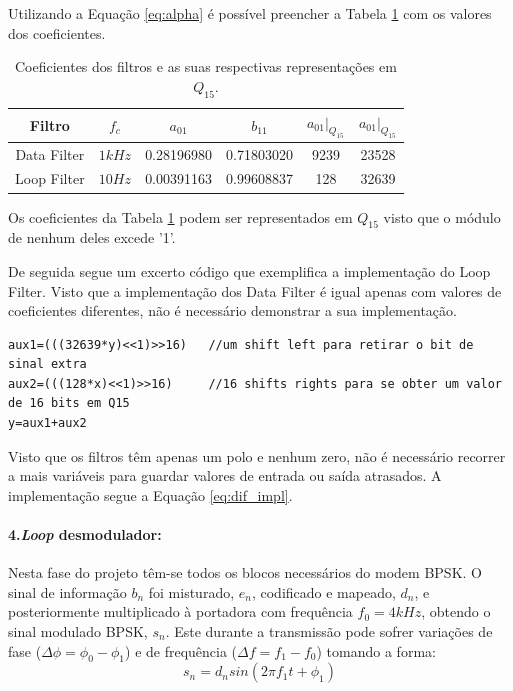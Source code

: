 \documentclass[11pt]{article}
\numberwithin{equation}{section}
\begin{document}
Utilizando a Equação \ref{eq:alpha} é possível preencher a Tabela \ref{tab:filter_coef} com os valores dos coeficientes.

	\begin{table}[H]
		\centering
		\begin{tabular}{|c|c|c|c|c|c|}
			\hline Filtro & $ f_{c} $ & $ a_{01} $ &  $ b_{11} $ & $ a_{01}|_{Q_{15}} $& $ a_{01}|_{Q_{15}} $ \\ 
			\hline
			\hline Data Filter & $ 1kHz $ & 0.28196980 & 0.71803020 & 9239 & 23528 \\ 
			\hline Loop Filter & $ 10Hz $ & 0.00391163 & 0.99608837 & 128 & 32639 \\ 
			\hline
		\end{tabular}
		\caption{Coeficientes dos filtros e as suas respectivas representações em $ Q_{15} $.}
		\label{tab:filter_coef} 
	\end{table}
	
Os coeficientes da Tabela \ref{tab:filter_coef} podem ser representados em $ Q_{15} $ visto que o módulo de nenhum deles excede '1'.

De seguida segue um excerto código que exemplifica a implementação do Loop Filter. Visto que a implementação dos Data Filter é igual apenas com valores de coeficientes diferentes, não é necessário demonstrar a sua implementação.

\begin{lstlisting}
aux1=(((32639*y)<<1)>>16)	//um shift left para retirar o bit de sinal extra
aux2=(((128*x)<<1)>>16)		//16 shifts rights para se obter um valor de 16 bits em Q15
y=aux1+aux2
\end{lstlisting}

Visto que os filtros têm apenas um polo e nenhum zero, não é necessário recorrer a mais variáveis para guardar valores de entrada ou saída atrasados. A implementação segue a Equação \ref{eq:dif_impl}.

\paragraph{4.\textit{Loop} desmodulador:} \hspace{0pt}
   \label{para:P3-4}

Nesta fase do projeto têm-se todos os blocos necessários do modem BPSK. O sinal de informação $b_n$ foi misturado, $e_n$, codificado e mapeado, $d_n$, e posteriormente multiplicado à portadora com frequência $f_0 = 4kHz$, obtendo o sinal modulado BPSK, $s_n$. Este durante a transmissão pode sofrer variações de fase ($\Delta\phi=\phi_0-\phi_1$) e de frequência ($\Delta f = f_1-f_0$) tomando a forma:
\begin{equation}
	s_n=d_nsin(2\pi f_1t+ \phi_1)
\end{equation}
\end{document}
